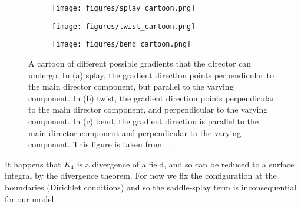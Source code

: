 \documentclass[reqno]{article}
\begin{document}
  \begin{figure}[h]
    \centering
    \begin{subfigure}{0.45\textwidth}
      \texttt{[image: figures/splay\_cartoon.png]}
      \caption{}
      \label{fig:splay-cartoon}
    \end{subfigure}
    \hfill
    \begin{subfigure}{0.45\textwidth}
      \texttt{[image: figures/twist\_cartoon.png]}
      \caption{}
      \label{fig:twist-cartoon}
    \end{subfigure}
    \hfill
    \begin{subfigure}{0.45\textwidth}
      \texttt{[image: figures/bend\_cartoon.png]}
      \caption{}
      \label{fig:bend-cartoon}
    \end{subfigure}
    \caption{A cartoon of different possible gradients that the director can
      undergo. In (a) splay, the gradient direction points perpendicular to the
      main director component, but parallel to the varying component. In (b)
      twist, the gradient direction points perpendicular to the main director
      component, and perpendicular to the varying component. In (c) bend, the
      gradient direction is parallel to the main director component and
      perpendicular to the varying component. This figure is taken from
      ~\cite{selinger_introduction_2016}.}
    \label{fig:deformation-cartoon}
  \end{figure}
  It happens that $K_4$ is a divergence of a field, and so can be reduced to a
  surface integral by the divergence theorem.
  For now we fix the configuration at the boundaries (Dirichlet conditions) and
  so the saddle-splay term is inconsequential for our model.
\end{document}
